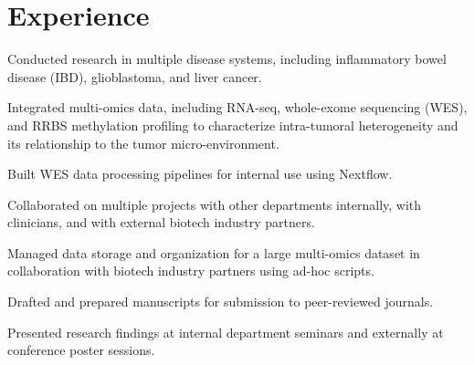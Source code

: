 \begin{minipage}[t]{0.66\textwidth} %


\section{Experience}

\vspace{\topsep} %
\begin{tightitemize}
\item Conducted research in multiple disease systems, including inflammatory bowel disease (IBD), glioblastoma, and liver cancer.
\item Integrated multi-omics data, including RNA-seq, whole-exome sequencing (WES), and RRBS methylation profiling to characterize intra-tumoral heterogeneity and its relationship to the  tumor micro-environment.
\item Built WES data processing pipelines for internal use using Nextflow.
\item Collaborated on multiple projects with other departments internally, with clinicians, and with external biotech industry partners.
\item Managed data storage and organization for a large multi-omics dataset in collaboration with biotech industry partners using ad-hoc scripts.
\item Drafted and prepared manuscripts for submission to peer-reviewed journals.
\item Presented research findings at internal department seminars and externally at conference poster sessions.  
\end{tightitemize}

\sectionspace %




\end{minipage}
